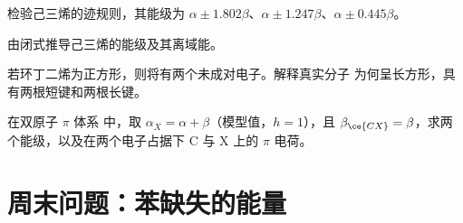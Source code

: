 \begin{exercise}[$\star\star$]\label{exo:b2:huckel:9}
检验己三烯的迹规则，其能级为 $\alpha \pm 1.802\beta$、$\alpha \pm
1.247\beta$、$\alpha \pm 0.445\beta$。
\end{exercise}

\begin{exercise}[$\star\star\star$]\label{exo:b2:huckel:10}
由闭式推导己三烯的能级及其离域能。
\end{exercise}

\begin{exercise}[$\star\star\star$]\label{exo:b2:huckel:11}
若环丁二烯为正方形，则将有两个未成对电子。解释真实分子
为何呈长方形，具有两根短键和两根长键。
\end{exercise}

\begin{exercise}[$\star\star\star$]\label{exo:b2:huckel:12}
在双原子 $\pi$ 体系  中，取 $\alpha_X = \alpha + \beta$（模型值，$h = 1$），且
$\beta_{\ce{CX}} = \beta$，求两个能级，以及在两个电子占据下
C 与 X 上的 $\pi$ 电荷。
\end{exercise}

\section{周末问题：苯缺失的能量}

